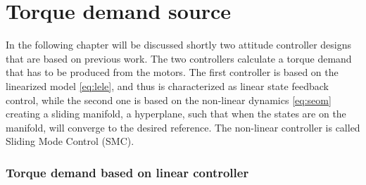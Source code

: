 \chapter{Torque demand source}

In the following chapter will be discussed shortly two attitude controller designs that are based on previous work. The two controllers calculate a torque demand that has to be produced from the motors. The first controller is based on the linearized model \eqref{eq:lele}, and thus is characterized as linear state feedback control, while the second one is based on the non-linear dynamics \eqref{eq:seom} creating a sliding manifold, a hyperplane, such that when the states are on the manifold, will converge to the desired reference. The non-linear controller is called Sliding Mode Control (SMC).
  
 \subsection{Torque demand based on linear controller}
 
